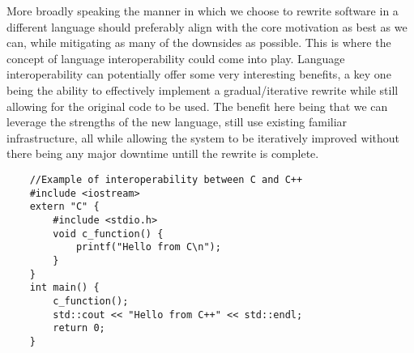 More broadly speaking the manner in which we choose to rewrite software in a different language should preferably align with the core motivation as best as we can, while mitigating as many of the downsides as possible. This is where the concept of language interoperability could come into play. Language interoperability can potentially offer some very interesting benefits, a key one being the ability to effectively implement a gradual/iterative rewrite while still allowing for the original code to be used. The benefit here being that we can leverage the strengths of the new language, still use existing familiar infrastructure, all while allowing the system to be iteratively improved without there being any major downtime untill the rewrite is complete.

\begin{lstlisting}
    //Example of interoperability between C and C++
    #include <iostream>
    extern "C" {
        #include <stdio.h>
        void c_function() {
            printf("Hello from C\n");
        }
    }
    int main() {
        c_function();
        std::cout << "Hello from C++" << std::endl;
        return 0;
    }
\end{lstlisting}




